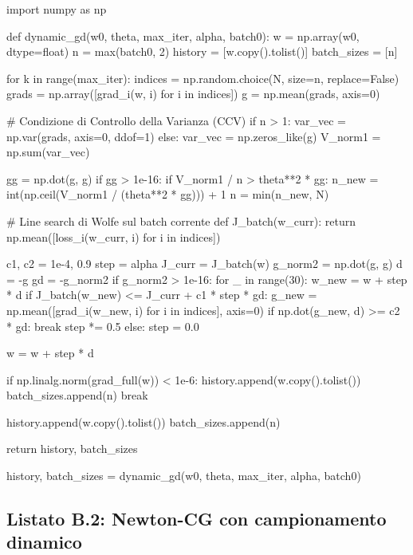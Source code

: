 \begin{pythoncode}[title= Dynamic GD]

import numpy as np

def dynamic_gd(w0, theta, max_iter, alpha, batch0):
    w = np.array(w0, dtype=float)
    n = max(batch0, 2)
    history     = [w.copy().tolist()]
    batch_sizes = [n]

    for k in range(max_iter):
        indices = np.random.choice(N, size=n, replace=False)
        grads = np.array([grad_i(w, i) for i in indices])
        g = np.mean(grads, axis=0)

        # Condizione di Controllo della Varianza (CCV)
        if n > 1:
            var_vec = np.var(grads, axis=0, ddof=1)
        else:
            var_vec = np.zeros_like(g)
        V_norm1 = np.sum(var_vec)

        gg = np.dot(g, g)
        if gg > 1e-16:
            if V_norm1 / n > theta**2 * gg:
                n_new = int(np.ceil(V_norm1 / (theta**2 * gg))) + 1
                n = min(n_new, N)

        # Line search di Wolfe sul batch corrente
        def J_batch(w_curr):
            return np.mean([loss_i(w_curr, i) for i in indices])

        c1, c2 = 1e-4, 0.9
        step = alpha
        J_curr = J_batch(w)
        g_norm2 = np.dot(g, g)
        d = -g
        gd = -g_norm2
        if g_norm2 > 1e-16:
            for _ in range(30):
                w_new = w + step * d
                if J_batch(w_new) <= J_curr + c1 * step * gd:
                    g_new = np.mean([grad_i(w_new, i) for i in indices], axis=0)
                    if np.dot(g_new, d) >= c2 * gd:
                        break
                step *= 0.5
            else:
                step = 0.0

        w = w + step * d

        if np.linalg.norm(grad_full(w)) < 1e-6:
            history.append(w.copy().tolist())
            batch_sizes.append(n)
            break

        history.append(w.copy().tolist())
        batch_sizes.append(n)

    return history, batch_sizes

history, batch_sizes = dynamic_gd(w0, theta, max_iter, alpha, batch0)
\end{pythoncode}


\subsection{Listato B.2: Newton-CG con campionamento dinamico}

